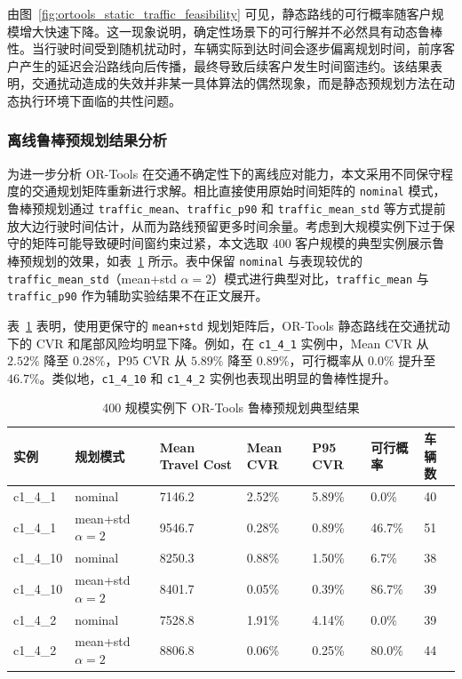 \documentclass[12pt,a4paper,UTF8]{article}
\begin{document}
由图~\ref{fig:ortools_static_traffic_feasibility} 可见，静态路线的可行概率随客户规模增大快速下降。这一现象说明，确定性场景下的可行解并不必然具有动态鲁棒性。当行驶时间受到随机扰动时，车辆实际到达时间会逐步偏离规划时间，前序客户产生的延迟会沿路线向后传播，最终导致后续客户发生时间窗违约。该结果表明，交通扰动造成的失效并非某一具体算法的偶然现象，而是静态预规划方法在动态执行环境下面临的共性问题。

\subsubsection{离线鲁棒预规划结果分析}

为进一步分析 OR-Tools 在交通不确定性下的离线应对能力，本文采用不同保守程度的交通规划矩阵重新进行求解。相比直接使用原始时间矩阵的 \texttt{nominal} 模式，鲁棒预规划通过 \texttt{traffic\_mean}、\texttt{traffic\_p90} 和 \texttt{traffic\_mean\_std} 等方式提前放大边行驶时间估计，从而为路线预留更多时间余量。考虑到大规模实例下过于保守的矩阵可能导致硬时间窗约束过紧，本文选取 400 客户规模的典型实例展示鲁棒预规划的效果，如表~\ref{tab:ortools_robust_planning_result} 所示。表中保留 \texttt{nominal} 与表现较优的 \texttt{traffic\_mean\_std}（mean+std $\alpha=2$）模式进行典型对比，\texttt{traffic\_mean} 与 \texttt{traffic\_p90} 作为辅助实验结果不在正文展开。

表~\ref{tab:ortools_robust_planning_result} 表明，使用更保守的 \texttt{mean+std} 规划矩阵后，OR-Tools 静态路线在交通扰动下的 CVR 和尾部风险均明显下降。例如，在 \texttt{c1\_4\_1} 实例中，Mean CVR 从 $2.52\%$ 降至 $0.28\%$，P95 CVR 从 $5.89\%$ 降至 $0.89\%$，可行概率从 $0.0\%$ 提升至 $46.7\%$。类似地，\texttt{c1\_4\_10} 和 \texttt{c1\_4\_2} 实例也表现出明显的鲁棒性提升。

\clearpage
\begin{table}[!htbp]
    \centering
    \caption{400 规模实例下 OR-Tools 鲁棒预规划典型结果}
    \label{tab:ortools_robust_planning_result}
    \small
    \begin{tabularx}{\textwidth}{p{2.0cm} p{2.6cm} p{2.0cm} p{1.8cm} p{1.8cm} p{2.0cm} X}
        \toprule
        实例 & 规划模式 & Mean Travel Cost & Mean CVR & P95 CVR & 可行概率 & 车辆数 \\
        \midrule
        c1\_4\_1  & nominal & 7146.2 & 2.52\% & 5.89\% & 0.0\%  & 40 \\
        c1\_4\_1  & mean+std $\alpha=2$ & 9546.7 & 0.28\% & 0.89\% & 46.7\% & 51 \\
        \midrule
        c1\_4\_10 & nominal & 8250.3 & 0.88\% & 1.50\% & 6.7\%  & 38 \\
        c1\_4\_10 & mean+std $\alpha=2$ & 8401.7 & 0.05\% & 0.39\% & 86.7\% & 39 \\
        \midrule
        c1\_4\_2  & nominal & 7528.8 & 1.91\% & 4.14\% & 0.0\%  & 39 \\
        c1\_4\_2  & mean+std $\alpha=2$ & 8806.8 & 0.06\% & 0.25\% & 80.0\% & 44 \\
        \bottomrule
    \end{tabularx}
\end{table}
\end{document}
